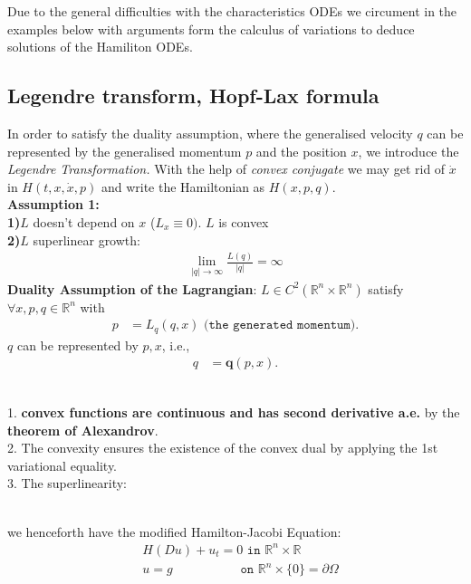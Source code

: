\begin{remark}
Due to the general difficulties with the characteristics ODEs we circument in the examples below with arguments form the calculus of variations to deduce solutions of the Hamiliton ODEs. 	
\end{remark}


\subsection{Legendre transform, Hopf-Lax formula}
In order to satisfy the duality assumption, where the generalised velocity $q$ can be represented by the generalised momentum $p$ and the position $x$, we introduce the \textit{Legendre Transformation.} With the help of \textit{convex conjugate} we may get rid of $\dot{x}$ in $H(t, x, \dot{x}, p)$ and write the Hamiltonian as $H(x, p, q)$.   \\
\textbf{Assumption 1:}\\
\textbf{1)}$L$ doesn't depend on $x$ ($L_x \equiv 0)$. $L$ is convex\\
\textbf{2)}$L$ superlinear growth:
\begin{align*}
	\lim_{|q| \rightarrow \infty} \frac{L(q)}{|q|} = \infty
\end{align*}
\textbf{Duality Assumption of the Lagrangian}: $L \in C^2(\mathbb{R}^n \times \mathbb{R}^n)$ satisfy $\forall x , p, q \in \mathbb{R}^n$ with
\begin{align*}
	p &= L_q(q, x)\texttt{ (the generated momentum)}.
\end{align*}
$q$ can be represented by $p, x$, i.e., 
\begin{align*}
	q &= \textbf{q}(p, x).
\end{align*}
\begin{remark}\quad\\
1. \textbf{convex functions are continuous and has second derivative a.e.} by the \textbf{theorem of Alexandrov}.	\\
2. The convexity ensures the existence of the convex dual by applying the 1st variational equality. \\
3. The superlinearity:
\end{remark}
\quad\\
we henceforth have the modified Hamilton-Jacobi Equation:
\begin{align*}
	&H(Du) + u_t = 0 \texttt{ in } \mathbb{R}^n \times \mathbb{R}\\
	&u = g \qquad \qquad \quad \texttt{ on } \mathbb{R}^n \times \{0\} = \partial\Omega
\end{align*}

